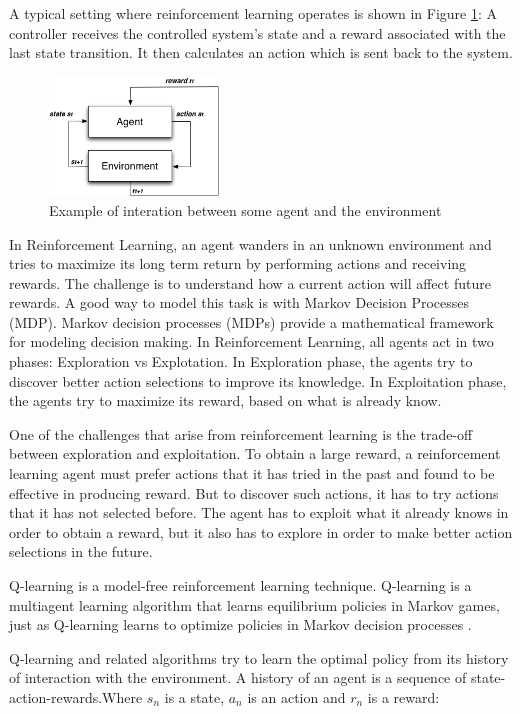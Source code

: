 \documentclass[espaco=umemeio,chapter=TITLE,twoside,openright]{abnt}
\begin{document}
A typical setting where
reinforcement learning operates is shown in Figure \ref{fig:agentenv}: A controller receives the controlled
system’s state and a reward associated with the last state transition. It then calculates an
action which is sent back to the system.


\begin{figure}
\centering
\includegraphics[width=0.4\textwidth]{./images/agentenv.png}
\caption{Example of interation between some agent and the environment}
\label{fig:agentenv}
\end{figure}

In Reinforcement Learning, an agent wanders in an unknown environment and tries to maximize its long term return by performing actions and receiving rewards. The challenge is to understand how a current action will affect future rewards. A good way to model this task is with Markov Decision Processes (MDP). Markov decision processes (MDPs) provide a mathematical framework for modeling decision making. In Reinforcement Learning, all agents act in two phases: Exploration vs Explotation. In Exploration phase, the agents try to discover better action selections to improve its knowledge. In Exploitation phase, the agents try to maximize its reward, based on what is already know.

One of the challenges that arise from reinforcement learning is the trade-off between exploration and exploitation. To obtain a large reward, a reinforcement learning
agent must prefer actions that it has tried in the past and found to be effective in producing reward. But to discover such actions, it has to try actions that it has not selected before. The agent has to exploit what it already knows in order to obtain a reward, but it also has to explore in order to make better action selections in the future.

Q-learning is a model-free reinforcement learning technique. Q-learning is a multiagent learning algorithm that learns equilibrium policies in Markov games, just as Q-learning learns to optimize policies in Markov decision processes \cite{Greenwald2003}.

Q-learning and related algorithms try to learn the optimal policy from its history of interaction with the environment. A history of an agent is a sequence of state-action-rewards.Where $s_{n}$ is a state, $a_{n}$ is an action and $r_{n}$ is a reward:
\end{document}

